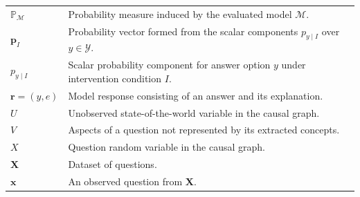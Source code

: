 \begin{longtable}{@{}>{\raggedright\arraybackslash}p{} p{}@{}}
	$\mathbb{P}_{\mathcal{M}}$                         & Probability measure induced by the evaluated model $\mathcal{M}$.                                                                                                                                                  \\
	$\mathbf{p}_{I}$                                   & Probability vector formed from the scalar components $p_{y\mid I}$ over $y\in\mathcal{Y}$.                                                                                                                         \\
	$p_{y\mid I}$                                      & Scalar probability component for answer option $y$ under intervention condition $I$.                                                                                                                               \\
	$\mathbf{r}=(y,e)$                                 & Model response consisting of an answer and its explanation.                                                                                                                                                        \\
	$U$                                                & Unobserved state-of-the-world variable in the causal graph.                                                                                                                                                        \\
	$V$                                                & Aspects of a question not represented by its extracted concepts.                                                                                                                                                   \\
	$X$                                                & Question random variable in the causal graph.                                                                                                                                                                      \\
	$\mathbf{X}$                                       & Dataset of questions.                                                                                                                                                                                              \\
	$\mathbf{x}$                                       & An observed question from $\mathbf{X}$.                                                                                                                                                                            \\

\end{longtable}
